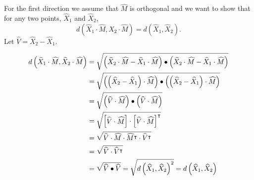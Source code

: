 \documentclass{ximera}
\begin{document}
\begin{problem}
  
\begin{freeResponse}
For the first direction we assume that $\hat{M}$ is orthogonal and we want to show that for any two points,  $\hat{X}_{1}$ and $\hat{X}_{2}$,%
\[
   d\left( \hat{X}_{1}  \cdot\hat{M},\hat{X}_{2}
   \cdot\hat{M}\right)  =d\left(  \hat{X}_{1},\hat{X}_{2}\right).
\]
Let $ \hat{V}=\hat{X}_{2}-\hat{X}_{1}$.

\begin{align*}
   d\left( \widehat{X}_{1}  \cdot\widehat{M},\widehat{X}_{2}
   \cdot\widehat{M}\right) &= \sqrt{\left(\widehat{X}_{2}  \cdot\widehat{M}-\widehat{X}_{1}  \cdot\widehat{M}\right) \bullet \left(\widehat{X}_{2}  	\cdot\widehat{M}-\widehat{X}_{1}  \cdot\widehat{M}\right)} \\
   & = \sqrt{\left( \left( \widehat{X}_{2}-\widehat{X}_{1} \right) \cdot\widehat{M}\right) \bullet \left( \left( \widehat{X}_{2}-\widehat{X}_{1} 		\right) \cdot\widehat{M}\right)} \\
   & = \sqrt{ \left(\widehat{V}\cdot\widehat{M} \right) \bullet \left(\widehat{V}\cdot\widehat{M} \right)}\\
   & = \sqrt{
       \begin{bmatrix}
          \widehat{V}\cdot\widehat{M}
       \end{bmatrix} \cdot
       \begin{bmatrix}
          \widehat{V}\cdot\widehat{M}
       \end{bmatrix}^\intercal}\\
   & = \sqrt{ \widehat{V}\cdot\widehat{M} \cdot \widehat{M}^\intercal \cdot \widehat{V}^\intercal} \\
   & = \sqrt{ \widehat{V} \cdot \widehat{V}^\intercal} \\
   & = \sqrt{\widehat{V} \bullet \widehat{V}} = \sqrt{d\left(  \widehat{X}_{1},\widehat{X}_{2}\right)^2} = d\left( \widehat{X}_{1},\widehat{X}_{2}\right)
\end{align*}


\end{freeResponse}
\end{problem}
\end{document}
